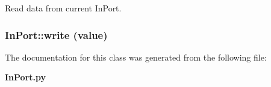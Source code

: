Read data from current In\-Port. 

\subsubsection{\setlength{\rightskip}{0pt plus 5cm}In\-Port::write (value)}\label{classInPort_InPorta4}




The documentation for this class was generated from the following file:\begin{CompactItemize}
\item 
{\bf In\-Port.py}\end{CompactItemize}

